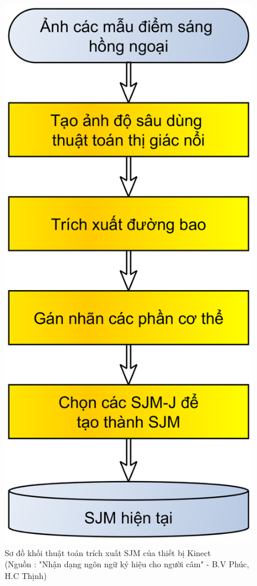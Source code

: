 \FloatBarrier
\begin{figure}[htp]
\begin{center}
\includegraphics[scale=0.15]{chap3/c3_figs/TrichKhungXuong.png}
\end{center}
\caption{Sơ đồ khối thuật toán trích xuất SJM của thiết bị Kinect \\(Nguồn : "Nhận dạng ngôn ngữ ký hiệu cho người câm" - B.V Phúc, H.C Thịnh)}
\label{fig:TrichKhungXuong}
\end{figure}
\FloatBarrier

